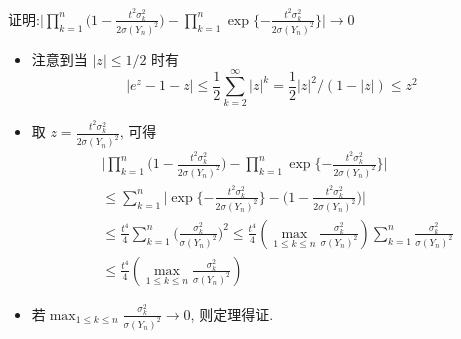 \documentclass[Prob-All.tex]{subfiles}
\begin{document}
\begin{frame}{证明:$\big|\prod_{k=1}^{n}\big(1-\frac{t^{2} \sigma_{k}^{2}}{2 \sigma(Y_n)^2}\big)-\prod_{k=1}^{n} \exp\{-\frac{t^2\sigma_k^2}{2\sigma(Y_n)^2}\}\big| \rightarrow 0$}
\vspace{-0.1cm}
\begin{itemize}

	\item 注意到当 $|z| \leq 1 / 2$ 时有
	{\small \[
	\left|e^{z}-1-z\right| \leq \frac{1}{2} \sum_{k=2}^{\infty}|z|^{k}=\frac{1}{2}|z|^{2} /(1-|z|) \leq z^{2}
	\]}
    \item 取 $z=\frac{t^{2} \sigma_{k}^{2}}{2 \sigma(Y_n)^2}$, 可得
    {\small \begin{align*}
		&\big|\prod_{k=1}^{n}\big(1-\frac{t^{2} \sigma_{k}^{2}}{2 \sigma(Y_n)^2}\big)-\prod_{k=1}^{n} \exp\{-\frac{t^2\sigma_k^2}{2\sigma(Y_n)^2}\}\big|\\
		&\leq \sum_{k=1}^{n}\big|\exp\{-\frac{t^2\sigma_k^2}{2\sigma(Y_n)^2}\}-\big(1-\frac{t^{2} \sigma_{k}^{2}}{2 \sigma(Y_n)^2}\big)\big|\\
		&\leq \frac{t^4}{4}\sum_{k=1}^{n}\big(\frac{\sigma_{k}^{2}}{\sigma(Y_n)^2}\big)^2\leq \frac{t^{4}}{4}\left(\max _{1 \leq k \leq n} \frac{\sigma_{k}^{2}}{\sigma(Y_n)^2}\right) \sum_{k=1}^{n} \frac{\sigma_{k}^{2}}{\sigma(Y_n)^2}\\
		&\leq \frac{t^{4}}{4}\left(\max _{1 \leq k \leq n} \frac{\sigma_{k}^{2}}{\sigma(Y_n)^2}\right)
	\end{align*}}
	\item 若$\max _{1 \leq k \leq n} \frac{\sigma_{k}^{2}}{\sigma(Y_n)^2}\rightarrow 0$, 则定理得证.
\end{itemize}

\end{frame}
\end{document}
